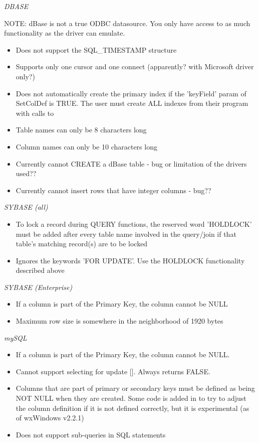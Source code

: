 {\it DBASE}

NOTE: dBase is not a true ODBC datasource.  You only have access to as much 
functionality as the driver can emulate.

\begin{itemize}\itemsep=0pt
\item Does not support the SQL\_TIMESTAMP structure
\item Supports only one cursor and one connect (apparently? with Microsoft driver only?)
\item Does not automatically create the primary index if the 'keyField' param of SetColDef is TRUE.  The user must create ALL indexes from their program with calls to 
\item Table names can only be 8 characters long
\item Column names can only be 10 characters long
\item Currently cannot CREATE a dBase table - bug or limitation of the drivers used??
\item Currently cannot insert rows that have integer columns - bug??
\end{itemize}

{\it SYBASE (all)}
\begin{itemize}\itemsep=0pt
\item To lock a record during QUERY functions, the reserved word 'HOLDLOCK' must be added after every table name involved in the query/join if that table's matching record(s) are to be locked
\item Ignores the keywords 'FOR UPDATE'.  Use the HOLDLOCK functionality described above
\end{itemize}

{\it SYBASE (Enterprise)}
\begin{itemize}\itemsep=0pt
\item If a column is part of the Primary Key, the column cannot be NULL
\item Maximum row size is somewhere in the neighborhood of 1920 bytes
\end{itemize}

{\it mySQL}
\begin{itemize}\itemsep=0pt
\item If a column is part of the Primary Key, the column cannot be NULL.
\item Cannot support selecting for update [].  Always returns FALSE.
\item Columns that are part of primary or secondary keys must be defined as being NOT NULL when they are created.  Some code is added in  to try to adjust the column definition if it is not defined correctly, but it is experimental (as of wxWindows v2.2.1)
\item Does not support sub-queries in SQL statements
\end{itemize}

